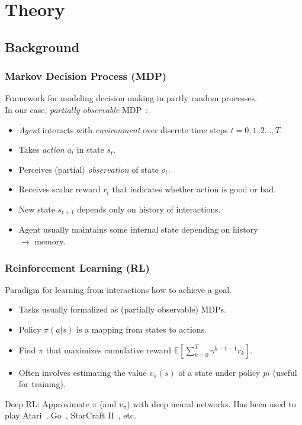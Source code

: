\section{Theory}

\subsection{Background}

\begin{frame}
    \frametitle{Markov Decision Process (MDP)}
    
    Framework for modeling decision making in partly random processes.\\
    In our case, \textit{partially observable} MDP~\cite{kaelbling_pomdp_1998}:

    \begin{itemize}
        \item \textit{Agent} interacts with \textit{environment} over discrete time steps \(t = 0, 1, 2\dots, T\).
        \item Takes \textit{action} \(a_t\) in state \(s_t\).
        \item Perceives (partial) \textit{observation} of state \(o_t\).
        \item Receives scalar reward \(r_t\) that indicates whether action is good or bad.
        \item New state \(s_{t+1}\) depends only on history of interactions.
        \item Agent usually maintains some internal state depending on history \\
        \(\rightarrow\) memory.
    \end{itemize}

    \begin{figure}
        \centering
        \scalebox{0.75}{}
    \end{figure}
\end{frame}

\begin{frame}
    \frametitle{Reinforcement Learning (RL)}

    Paradigm for learning from interactions how to achieve a goal.

    \begin{itemize}
        \item Tasks usually formalized as (partially observable) MDPs.
        \item Policy \(\pi(a|s)\) is a mapping from states to actions.
        \item Find \(\pi\) that maximizes cumulative reward \(\mathbb{E} \left\lbrack \sum_{k=0}^{T} \gamma^{k-t-1} r_k \right\rbrack\).
        \item Often involves estimating the value \(v_\pi(s)\) of a state under policy \(pi\) (useful for training). 
    \end{itemize}

    Deep RL: Approximate \(\pi\) (and \(v_\pi\)) with deep neural networks.
    Has been used to play Atari~\cite{mnih_human_2015}, Go~\cite{silver_alphago_2016}, StarCraft II~\cite{vinyals_alphastar_2019}, etc.

\end{frame}

